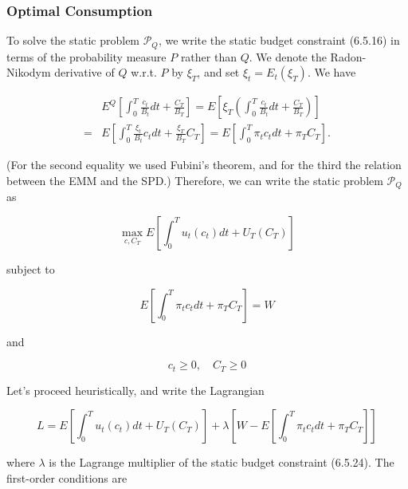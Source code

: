 \documentclass[\topdir/lecture\_notes.tex]{subfiles}
\begin{document}
\subsubsection{Optimal Consumption}
To solve the static problem $\mathcal{P}_{Q}$, we write the static budget constraint (6.5.16) in terms of the probability measure $P$ rather than $Q$. We denote the Radon-Nikodym derivative of $Q$ w.r.t. $P$ by $\xi_{T}$, and set $\xi_{t}=E_{t}\left(\xi_{T}\right)$. We have

\begin{equation}
\begin{aligned}
& E^{Q}\left[\int_{0}^{T} \frac{c_{t}}{B_{t}} d t+\frac{C_{T}}{B_{T}}\right]=E\left[\xi_{T}\left(\int_{0}^{T} \frac{c_{t}}{B_{t}} d t+\frac{C_{T}}{B_{T}}\right)\right] \\
= & E\left[\int_{0}^{T} \frac{\xi_{t}}{B_{t}} c_{t} d t+\frac{\xi_{T}}{B_{T}} C_{T}\right]=E\left[\int_{0}^{T} \pi_{t} c_{t} d t+\pi_{T} C_{T}\right] .
\end{aligned}
\end{equation}

(For the second equality we used Fubini's theorem, and for the third the relation between the EMM and the SPD.) Therefore, we can write the static problem $\mathcal{P}_{Q}$ as

\begin{equation}
\max _{c, C_{T}} E\left[\int_{0}^{T} u_{t}\left(c_{t}\right) d t+U_{T}\left(C_{T}\right)\right]
\end{equation}

subject to

\begin{equation}
E\left[\int_{0}^{T} \pi_{t} c_{t} d t+\pi_{T} C_{T}\right]=W \label{eq:6.5.24}
\end{equation}

and

\begin{equation}
c_{t} \geq 0, \quad C_{T} \geq 0
\end{equation}

Let's proceed heuristically, and write the Lagrangian

\begin{equation}
L=E\left[\int_{0}^{T} u_{t}\left(c_{t}\right) d t+U_{T}\left(C_{T}\right)\right]+\lambda\left[W-E\left[\int_{0}^{T} \pi_{t} c_{t} d t+\pi_{T} C_{T}\right]\right]
\end{equation}

where $\lambda$ is the Lagrange multiplier of the static budget constraint (6.5.24). The first-order conditions are
\end{document}
